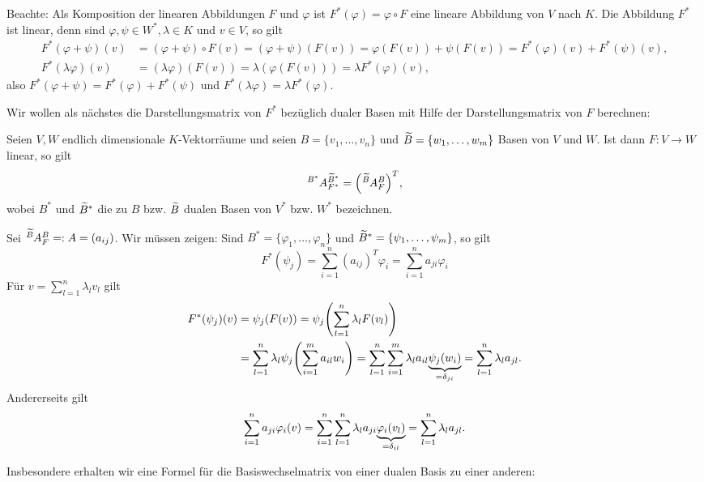 Beachte: Als Komposition der linearen Abbildungen $F$ und $\varphi$  ist $F^*(\varphi) = \varphi \circ F$ eine lineare Abbildung von $V$ nach $K$.
Die Abbildung $F^*$ ist linear, denn sind $\varphi, \psi \in W^*, \lambda \in K$ und $v \in V$, so gilt
\begin{align*}
	F^*(\varphi + \psi)(v) &= (\varphi + \psi) \circ F(v) = (\varphi + \psi)(F(v)) = \varphi(F(v)) + \psi(F(v)) = F^*(\varphi)(v) + F^*(\psi)(v), \\
	F^*(\lambda \varphi)(v) &= (\lambda \varphi)(F(v)) = \lambda(\varphi(F(v))) = \lambda F^*(\varphi)(v),
\end{align*}
also $F^*(\varphi + \psi) = F^*(\varphi) + F^*(\psi)$ und $F^*(\lambda \varphi) = \lambda F^*(\varphi)$.

Wir wollen als nächstes die Darstellungsmatrix von $F^*$ bezüglich dualer Basen mit Hilfe der Darstellungsmatrix von $F$ berechnen:

\begin{satz}
	\label{satz:12.8}
	Seien $V,W$ endlich dimensionale $K$-Vektorräume und seien $B = \{v_1,\dots,v_n\}$ und $\widetilde{B} = \{w_1,\dots,w_m\}$ Basen von $V$ und $W$.
	Ist dann $F \colon V \rightarrow W$ linear, so gilt
	\[
		\mat{A}{B^*}{\wt{B}^*}{F^*} = \enb{\mat{A}{\wt{B}}{B}{F}}^T,
	\]
	wobei $B^*$ und $\widetilde{B}^*$ die zu $B$ bzw. $\widetilde{B}$ dualen Basen von $V^*$ bzw. $W^*$ bezeichnen.
\end{satz}

\begin{beweis}
	Sei $\mat{A}{\wt{B}}{B}{F} =: A = (a_{ij})$.
	Wir müssen zeigen:
	Sind $B^* = \{\varphi_1,\dots,\varphi_n\}$ und $\widetilde{B}^* = \{\psi_1,\dots,\psi_m\}$, so gilt
	\[
		F^*(\psi_j) = \sum_{i=1}^{n} (a_{ij})^T \varphi_i = \sum_{i=1}^{n} a_{ji} \varphi_i
	\]
	Für $v = \sum_{l=1}^{n} \lambda_l v_l$ gilt
	\begin{align*}
		F^*(\psi_j)(v) &= \psi_j (F(v)) = \psi_j\enb{\sum_{l=1}^{n} \lambda_l F(v_l)} \\
		&= \sum_{l=1}^{n} \lambda_l \psi_j \enb{ \sum_{i=1}^{m} a_{il} w_i} = \sum_{l=1}^{n} \sum_{i=1}^{m} \lambda_l a_{il} \Underbrace{\psi_j(w_i)}{=\delta_{ji}} = \sum_{l=1}^{n} \lambda_l a_{jl}.
	\end{align*}
	Andererseits gilt
	\[
		\sum_{i=1}^{n} a_{ji} \varphi_i(v) = \sum_{i=1}^{n} \sum_{l=1}^{n} \lambda_l a_{ji} {\underbrace{\varphi_i(v_l)}_{=\delta_{il}}} = \sum_{l=1}^{n} \lambda_l a_{jl}. 
	\]
\end{beweis}

Insbesondere erhalten wir eine Formel für die Basiswechselmatrix von einer dualen Basis zu einer anderen:

